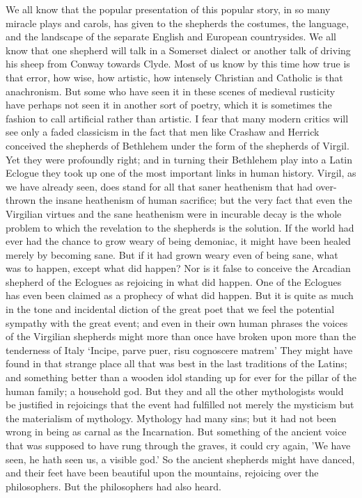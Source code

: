 We all know that the popular presentation of this popular story, in so many miracle plays and carols, has given to the shepherds the costumes, the language, and the landscape of the separate English and European countrysides. We all know that one shepherd will talk in a Somerset dialect or another talk of driving his sheep from Conway towards Clyde. Most of us know by this time how true is that error, how wise, how artistic, how intensely Christian and Catholic is that anachronism. But some who have seen it in these scenes of medieval rusticity have perhaps not seen it in another sort of poetry, which it is sometimes the fashion to call artificial rather than artistic. I fear that many modern critics will see only a faded classicism in the fact that men like Crashaw and Herrick conceived the shepherds of Bethlehem under the form of the shepherds of Virgil. Yet they were profoundly right; and in turning their Bethlehem play into a Latin Eclogue they took up one of the most important links in human history. Virgil, as we have already seen, does stand for all that saner heathenism that had over-thrown the insane heathenism of human sacrifice; but the very fact that even the Virgilian virtues and the sane heathenism were in incurable decay is the whole problem to which the revelation to the shepherds is the solution. If the world had ever had the chance to grow weary of being demoniac, it might have been healed merely by becoming sane. But if it had grown weary even of being sane, what was to happen, except what did happen? Nor is it false to conceive the Arcadian shepherd of the Eclogues as rejoicing in what did happen. One of the Eclogues has even been claimed as a prophecy of what did happen. But it is quite as much in the tone and incidental diction of the great poet that we feel the potential sympathy with the great event; and even in their own human phrases the voices of the Virgilian shepherds might more than once have broken upon more than the tenderness of Italy `Incipe, parve puer, risu cognoscere matrem' They might have found in that strange place all that was best in the last traditions of the Latins; and something better than a wooden idol standing up for ever for the pillar of the human family; a household god. But they and all the other mythologists would be justified in rejoicings that the event had fulfilled not merely the mysticism but the materialism of mythology. Mythology had many sins; but it had not been wrong in being as carnal as the Incarnation. But something of the ancient voice that was supposed to have rung through the graves, it could cry again, 'We have seen, he hath seen us, a visible god.' So the ancient shepherds might have danced, and their feet have been beautiful upon the mountains, rejoicing over the philosophers. But the philosophers had also heard.

